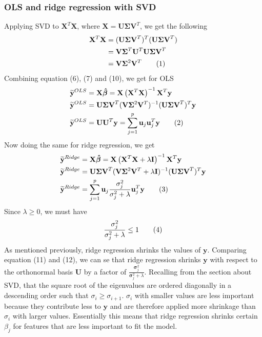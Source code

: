 \documentclass[a4paper,twocolumn]{article}
\newcommand\numberthis{\addtocounter{equation}{1}\tag{\theequation}}
\newcommand{\y}{\mathbf{y}}
\newcommand{\ytilde}{\mathbf{\widetilde{y}}}
\newcommand{\X}{\mathbf{X}}
\newcommand{\Bhat}{\boldsymbol{\hat{\beta}}}
\begin{document}
\subsubsection{OLS and ridge regression with SVD}
Applying SVD to $\X^{T}\X$, where $\X = \mathbf{U\Sigma V}^{T}$, we get the following
\begin{align*}
    \X^{T}\X &= (\mathbf{U\Sigma V}^{T})^{T}(\mathbf{U\Sigma V}^{T})\\
    &= \mathbf{V\Sigma}^{T}\mathbf{U}^{T}\mathbf{U\Sigma V}^{T}\\
    &= \mathbf{V}\mathbf{\Sigma}^{2}\mathbf{V}^{T}\numberthis\label{eqn}
\end{align*}
Combining equation (6), (7) and (10), we get for OLS
\begin{align*}
    \ytilde^{OLS} &= \X\Bhat = \X\left(\X^{T}\X\right)^{-1}\X^{T}\y\\
    \ytilde^{OLS} &= \mathbf{U\Sigma V}^{T}(\mathbf{V}\mathbf{\Sigma}^{2}\mathbf{V}^{T})^{-1}(\mathbf{U\Sigma V}^{T})^{T}\y\\
    \ytilde^{OLS} &= \mathbf{UU}^{T}\y = \sum_{j=1}^{p}\mathbf{u}_{j}\mathbf{u}_{j}^{T}\y \numberthis\label{eqn}
\end{align*}
Now doing the same for ridge regression, we get
\begin{align*}
        \ytilde^{Ridge} &= \X\Bhat = \X\left(\X^{T}\X + \lambda \mathbf{I}\right)^{-1}\X^{T}\y\\
    \ytilde^{Ridge} &= \mathbf{U\Sigma V}^{T}(\mathbf{V}\mathbf{\Sigma}^{2}\mathbf{V}^{T} + \lambda\mathbf{I})^{-1}(\mathbf{U\Sigma V}^{T})^{T}\y\\
    \ytilde^{Ridge} &= \sum_{j=1}^{p}\mathbf{u}_{j}\frac{\mathbf{\sigma}_{j}^{2}}{\mathbf{\sigma}_{j}^{2} + \lambda}\mathbf{u}_{j}^{T}\y \numberthis\label{eqn}
\end{align*}
Since $\lambda \geq 0$, we must have
\begin{align*}
    \frac{\mathbf{\sigma}_{j}^{2}}{\mathbf{\sigma}_{j}^{2} + \lambda} \leq 1 \numberthis\label{eqn}
\end{align*}
As mentioned previously, ridge regression shrinks the values of $\y$. Comparing equation (11) and (12), we can se that ridge regression shrinks $\y$ with respect to the orthonormal basis $\mathbf{U}$ by a factor of $\frac{\mathbf{\sigma}_{j}^{2}}{\mathbf{\sigma}_{j}^{2} + \lambda}$. Recalling from the section about SVD, that the square root of the eigenvalues are ordered diagonally in a descending order such that $\sigma_{i} \geq \sigma_{i+1}$. $\sigma_{i}$ with smaller values are less important because they contribute less to $\y$ and are therefore applied more shrinkage than $\sigma_{i}$ with larger values. Essentially this means that ridge regression shrinks certain $\beta_{j}$ for features that are less important to fit the model.
\end{document}

